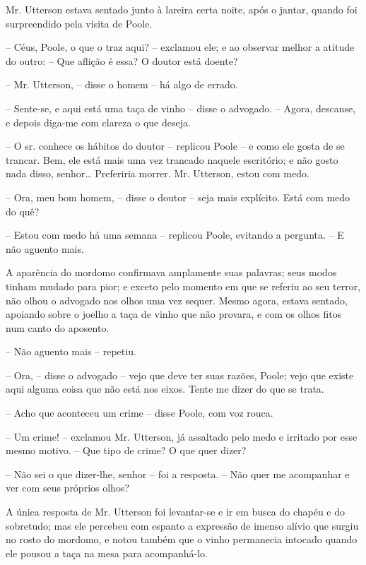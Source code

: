 Mr. Utterson estava sentado junto à lareira certa noite, após o jantar,
quando foi surpreendido pela visita de Poole.

-- Céus, Poole, o que o traz aqui? -- exclamou ele; e ao observar melhor
a atitude do outro: -- Que aflição é essa? O doutor está doente?

-- Mr. Utterson, -- disse o homem -- há algo de errado.

-- Sente-se, e aqui está uma taça de vinho -- disse o advogado. -- Agora,
descanse, e depois diga-me com clareza o que deseja.

-- O sr. conhece os hábitos do doutor -- replicou Poole -- e como ele
gosta de se trancar.  Bem, ele está mais uma vez trancado naquele
escritório; e não gosto nada disso, senhor\ldots{}  Preferiria morrer.  Mr.
Utterson, estou com medo.

-- Ora, meu bom homem, --  disse o doutor -- seja mais explícito.  Está
com medo do quê?

-- Estou com medo há uma semana -- replicou Poole, evitando a pergunta.
-- E não aguento mais.

A aparência do mordomo confirmava amplamente suas palavras; seus modos
tinham mudado para pior; e exceto pelo momento em que se referiu ao seu
terror, não olhou o advogado nos olhos uma vez sequer.  Mesmo agora,
estava sentado, apoiando sobre o joelho a taça de vinho que não
provara, e com os olhos fitos num canto do aposento.

-- Não aguento mais -- repetiu.

-- Ora, -- disse o advogado -- vejo que deve ter suas razões, Poole;
vejo que existe aqui alguma coisa que não está nos eixos.  Tente me
dizer do que se trata.

-- Acho que aconteceu um crime -- disse Poole, com voz rouca.

-- Um crime! -- exclamou Mr. Utterson, já assaltado pelo medo e irritado
por esse mesmo motivo. -- Que tipo de crime?  O que quer dizer?

-- Não sei o que dizer-lhe, senhor -- foi a resposta. -- Não quer me
acompanhar e ver com seus próprios olhos?

A única resposta de Mr. Utterson foi levantar-se e ir em busca do chapéu
e do sobretudo; mas ele percebeu com espanto a expressão de imenso
alívio que surgiu no rosto do mordomo, e notou também que o vinho
permanecia intocado quando ele pousou a taça na mesa para acompanhá-lo.

